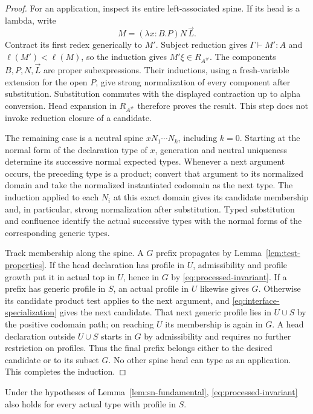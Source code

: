 \begin{proof}
For an application, inspect its entire left-associated spine. If its
head is a lambda, write
\[
                M=(\lambda x:B.P)N\,\vec L.
\]
Contract its first redex generically to $M'$. Subject reduction gives
$\Gamma\vdash M':A$ and $\ell(M')<\ell(M)$, so the induction gives
$M'\xi\in R_{A^\#}$. The components $B,P,N,\vec L$ are proper
subexpressions. Their inductions, using a fresh-variable extension for
the open $P$, give strong normalization of every component after
substitution. Substitution commutes with the displayed contraction up
to alpha conversion. Head expansion in $R_{A^\#}$ therefore proves
the result. This step does not invoke reduction closure of a candidate.

The remaining case is a neutral spine $xN_1\cdots N_k$, including
$k=0$. Starting at the normal form of the declaration type of $x$,
generation and neutral uniqueness determine its successive normal
expected types. Whenever a next argument occurs, the preceding type
is a product; convert that argument to its normalized domain and take
the normalized instantiated codomain as the next type. The induction
applied to each $N_i$ at this exact domain gives its candidate
membership and, in particular, strong normalization after substitution.
Typed substitution and confluence identify the actual successive
types with the normal forms of the corresponding generic types.

Track membership along the spine. A $G$ prefix propagates by
Lemma~\ref{lem:test-properties}. If the head declaration has profile
in $U$, admissibility and profile growth put it in actual top in $U$,
hence in $G$ by \eqref{eq:processed-invariant}. If a prefix has generic
profile in $S$, an actual profile in $U$ likewise gives $G$. Otherwise
its candidate product test applies to the next argument, and
\eqref{eq:interface-specialization} gives the next candidate. That
next generic profile lies in $U\cup S$ by the positive codomain path;
on reaching $U$ its membership is again in $G$. A head declaration
outside $U\cup S$ starts in $G$ by admissibility and requires no
further restriction on profiles. Thus the final prefix belongs either
to the desired candidate or to its subset $G$. No other spine head
can type as an application. This completes the induction.
\end{proof}

\begin{proposition}
\label{prop:advance-component}
Under the hypotheses of Lemma~\ref{lem:sn-fundamental},
\eqref{eq:processed-invariant} also holds for every actual type with
profile in $S$.
\end{proposition}

